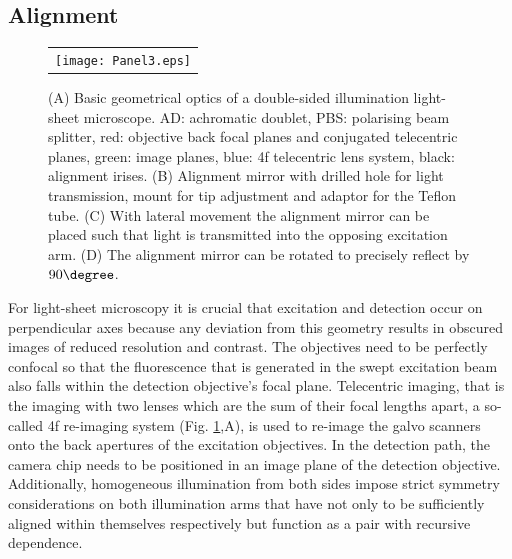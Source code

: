 \documentclass[12pt]{spieman}  %
\begin{document}
\subsection{Alignment}

\begin{figure}
   \begin{center}
   \begin{tabular}{c}
   \texttt{[image: Panel3.eps]}
   \end{tabular}
   \end{center}
   \caption{\label{fig:alignment} (A) Basic geometrical optics of a double-sided illumination light-sheet microscope. AD: achromatic doublet, PBS: polarising beam splitter, red: objective back focal planes and conjugated telecentric planes, green: image planes, blue: 4f telecentric lens system, black: alignment irises. (B) Alignment mirror with drilled hole for light transmission, mount for tip adjustment and adaptor for the Teflon tube. (C) With lateral movement the alignment mirror can be placed such that light is transmitted into the opposing excitation arm. (D) The alignment mirror can be rotated to precisely reflect by $90\degree$.} 
   \end{figure}

For light-sheet microscopy it is crucial that excitation and detection occur on perpendicular axes because any deviation from this geometry results in obscured images of reduced resolution and contrast. The objectives need to be perfectly confocal so that the fluorescence that is generated in the swept excitation beam also falls within the detection objective's focal plane. Telecentric imaging, that is the imaging with two lenses which are the sum of their focal lengths apart, a so-called 4f re-imaging system (Fig. \ref{fig:alignment},A), is used to re-image the galvo scanners onto the back apertures of the excitation objectives. In the detection path, the camera chip needs to be positioned in an image plane of the detection objective. Additionally, homogeneous illumination from both sides impose strict symmetry considerations on both illumination arms that have not only to be sufficiently aligned within themselves respectively but function as a pair with recursive dependence. 
\end{document}
